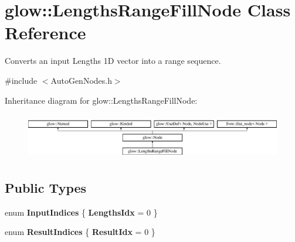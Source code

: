 \hypertarget{classglow_1_1_lengths_range_fill_node}{}\section{glow\+:\+:Lengths\+Range\+Fill\+Node Class Reference}
\label{classglow_1_1_lengths_range_fill_node}


Converts an input Lengths 1D vector into a range sequence.  




{\ttfamily \#include $<$Auto\+Gen\+Nodes.\+h$>$}

Inheritance diagram for glow\+:\+:Lengths\+Range\+Fill\+Node\+:\begin{figure}[H]
\begin{center}
\leavevmode
\includegraphics[height=2.028986cm]{classglow_1_1_lengths_range_fill_node}
\end{center}
\end{figure}
\subsection*{Public Types}
\begin{DoxyCompactItemize}
\item 
\mbox{\label{classglow_1_1_lengths_range_fill_node_a503d48d2a81415ffd744530ab5a5869e}} 
enum {\bfseries Input\+Indices} \{ {\bfseries Lengths\+Idx} = 0
 \}
\item 
\mbox{\label{classglow_1_1_lengths_range_fill_node_a1a4a5da0b5288427f0d9d0443377ed30}} 
enum {\bfseries Result\+Indices} \{ {\bfseries Result\+Idx} = 0
 \}
\end{DoxyCompactItemize}
